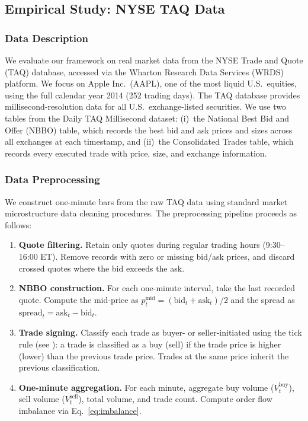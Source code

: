 \documentclass[11pt]{article}
\begin{document}
\subsection{Empirical Study: NYSE TAQ Data}\label{subsec:empirical}

\subsubsection*{Data Description}

We evaluate our framework on real market data from the NYSE Trade and Quote (TAQ) database, accessed via the Wharton Research Data Services (WRDS) platform.  We focus on Apple Inc.\ (AAPL), one of the most liquid U.S.\ equities, using the full calendar year 2014 (252 trading days). The TAQ database provides millisecond-resolution data for all U.S.\ exchange-listed securities.  We use two tables from the Daily TAQ Millisecond dataset: (i)~the National Best Bid and Offer (NBBO) table, which records the best bid and ask prices and sizes across all exchanges at each timestamp, and (ii)~the Consolidated Trades table, which records every executed trade with price, size, and exchange information.
\subsubsection*{Data Preprocessing}
We construct one-minute bars from the raw TAQ data using 
standard market microstructure data cleaning procedures. 
The preprocessing pipeline proceeds as follows:

\begin{enumerate}[nosep]
    \item \textbf{Quote filtering.}  Retain only quotes during regular trading hours (9:30--16:00 ET).  Remove records with zero or missing bid/ask prices, and discard crossed quotes where the bid exceeds the ask.

    \item \textbf{NBBO construction.}  For each one-minute interval, take the last recorded quote.  Compute the mid-price as $p_t^{\text{mid}} = (\text{bid}_t + \text{ask}_t)/2$ and the spread as $\text{spread}_t = \text{ask}_t - \text{bid}_t$.

    \item \textbf{Trade signing.}  Classify each trade as buyer- or 
seller-initiated using the tick rule (see 
\citealt{lee1991inferring}): a trade is classified as a buy 
(sell) if the trade price is higher (lower) than the previous 
trade price. Trades at the same price inherit the previous 
classification.

    \item \textbf{One-minute aggregation.}  For each minute, aggregate buy volume ($V_t^{\text{buy}}$), sell volume ($V_t^{\text{sell}}$), total volume, and trade count.  Compute order flow imbalance via Eq.~\eqref{eq:imbalance}.

\end{enumerate}
\end{document}
